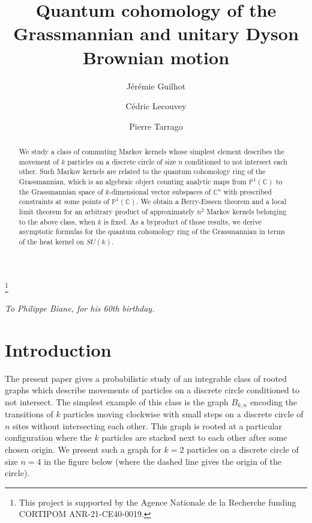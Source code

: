 \documentclass[10pt,11pt]{amsart}%
\title{Quantum cohomology of the Grassmannian and unitary Dyson Brownian motion}
\begin{document}
\thanks{This project is supported by the Agence Nationale de la
Recherche funding CORTIPOM ANR-21-CE40-0019.}


\author[J. Guilhot]{Jérémie Guilhot}
\address{Institut Denis Poisson, Université de Tours, France}
  

\author[C. Lecouvey]{Cédric Lecouvey} 
\address{Institut Denis Poisson, Université de Tours, France}
       
\author[P. Tarrago]{Pierre Tarrago} 
\address{Laboratoire de Probabilit\'es, Statistique et Mod\'elisation, Sorbonne Universit\'e, France}

\maketitle
\begin{abstract}
We study a class of commuting Markov kernels whose simplest element describes the movement of $k$ particles on a discrete circle of size $n$ conditioned to not intersect each other. Such Markov kernels are related to the quantum cohomology ring of the Grassmannian, which is an algebraic object counting analytic maps from $\mathbb{P}^1(\mathbb{C})$ to the Grassmannian space of $k$-dimensional vector subspaces of $\mathbb{C}^n$ with prescribed constraints at some points of $\mathbb{P}^1(\mathbb{C})$. We obtain a Berry-Esseen theorem and a local limit theorem for an arbitrary product of approximately $n^2$ Markov kernels belonging to the above class, when $k$ is fixed. As a byproduct of those results, we derive asymptotic formulas for the quantum cohomology ring of the Grassmannian in terms of the heat kernel on $SU(k)$.  
\end{abstract}

\vspace{0.5 cm}

\begin{flushright}
\textit{To Philippe Biane, for his 60th birthday.}
\end{flushright}

\vspace{0.5cm}

\section{Introduction}
The present paper gives a probabilistic study of an integrable class of rooted graphs which describe movements of particles on a discrete circle conditioned to not intersect. The simplest example of this class is the graph $B_{k,n}$ encoding the transitions of $k$ particles moving clockwise with small steps on a discrete circle of $n$ sites without intersecting each other. This graph is rooted at a particular configuration where the $k$ particles are stacked next to each other after some chosen origin. We present such a graph for $k=2$ particles on a discrete circle of size $n=4$ in the figure below (where the dashed line gives the origin of the circle).
\end{document}
